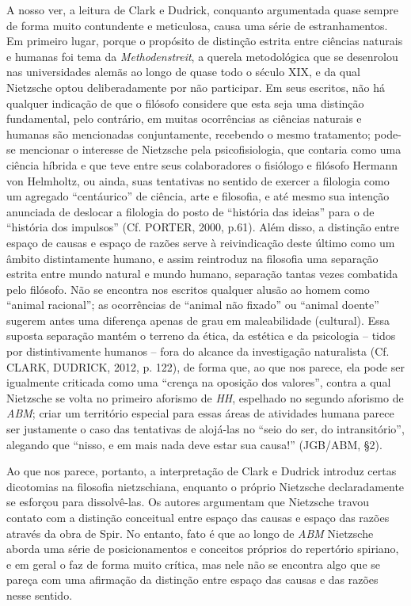 \documentclass[
	12pt,				%
	openright,			%
	oneside,			%
	a4paper,			%
	english,			%
	french,				%
	spanish,			%
	brazil				%
	]{abntex2}
\begin{document}
	A nosso ver, a leitura de Clark e Dudrick, conquanto argumentada quase sempre de forma muito contundente e  meticulosa, causa uma série de estranhamentos. Em primeiro lugar, porque o propósito de distinção estrita entre ciências naturais e humanas foi tema da \textit{Methodenstreit}, a querela metodológica que se desenrolou nas universidades alemãs ao longo de quase todo o século XIX, e da qual Nietzsche optou deliberadamente por não participar. Em seus escritos, não há qualquer indicação de que o filósofo considere que esta seja uma distinção fundamental, pelo contrário, em muitas ocorrências as ciências naturais e humanas são mencionadas conjuntamente, recebendo o mesmo tratamento; pode-se mencionar o interesse de Nietzsche pela psicofisiologia, que contaria como uma ciência híbrida e que teve entre seus colaboradores o fisiólogo e filósofo Hermann von Helmholtz, ou ainda, suas tentativas no sentido de exercer a filologia como um agregado “centáurico” de ciência, arte e filosofia, e até mesmo sua intenção anunciada de deslocar a filologia do posto de “história das ideias” para o de “história dos impulsos” (Cf. PORTER, 2000, p.61). Além disso, a distinção entre espaço de causas e espaço de razões serve à reivindicação deste último como um âmbito distintamente humano, e assim reintroduz na filosofia uma separação estrita entre mundo natural e mundo humano, separação tantas vezes combatida pelo filósofo. Não se encontra nos escritos qualquer alusão ao homem como “animal racional”; as ocorrências de “animal não fixado” ou “animal doente” sugerem antes uma diferença apenas de grau em maleabilidade (cultural). Essa suposta separação mantém o terreno da ética, da estética e da psicologia – tidos por distintivamente humanos – fora do alcance da investigação naturalista (Cf. CLARK, DUDRICK, 2012, p. 122), de forma que, ao que nos parece, ela pode ser igualmente criticada como uma “crença na oposição dos valores”, contra a qual Nietzsche se volta no primeiro aforismo de \textit{HH}, espelhado no segundo aforismo de \textit{ABM}; criar um território especial para essas áreas de atividades humana parece ser justamente o caso das tentativas de alojá-las no “seio do ser, do intransitório”, alegando que “nisso, e em mais nada deve estar sua causa!” (JGB/ABM, §2).
	
	Ao que nos parece, portanto, a interpretação de Clark e Dudrick introduz certas dicotomias na filosofia nietzschiana, enquanto o próprio Nietzsche declaradamente se esforçou para dissolvê-las. Os autores argumentam que Nietzsche travou contato com a distinção conceitual entre espaço das causas e espaço das razões através da obra de Spir. No entanto, fato é que ao longo de \textit{ABM} Nietzsche aborda  uma série de posicionamentos e conceitos próprios do repertório spiriano, e em geral o faz de forma muito crítica, mas nele não se encontra algo que se pareça com uma afirmação da distinção entre espaço das causas e das razões nesse sentido.
\end{document}
